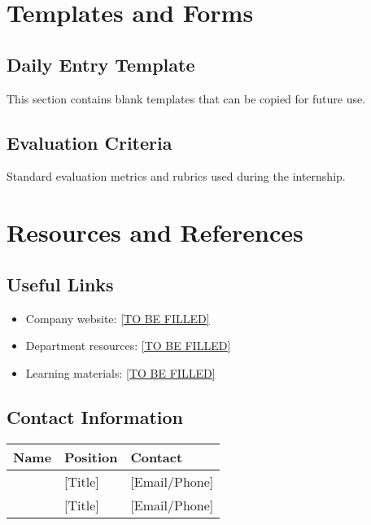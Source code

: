 \documentclass[12pt,a4paper,oneside]{book}
\begin{document}
\cleardoublepage

\appendix

\chapter{Templates and Forms}
\section{Daily Entry Template}
This section contains blank templates that can be copied for future use.

\section{Evaluation Criteria}
Standard evaluation metrics and rubrics used during the internship.

\chapter{Resources and References}
\section{Useful Links}
\begin{itemize}
    \item Company website: \url{[TO BE FILLED]}
    \item Department resources: \url{[TO BE FILLED]}
    \item Learning materials: \url{[TO BE FILLED]}
\end{itemize}

\section{Contact Information}
\begin{tabular}{|l|l|l|}
\hline
\rowcolor{lightgray}
\textbf{Name} & \textbf{Position} & \textbf{Contact} \\
\hline
[Supervisor Name] & [Title] & [Email/Phone] \\
\hline
[HR Contact] & [Title] & [Email/Phone] \\
\hline
\end{tabular}
\end{document}
